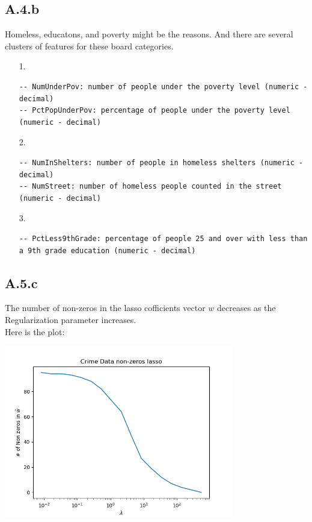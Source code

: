 \documentclass[]{article}
\begin{document}
    \subsection*{A.4.b}
        Homeless, educatons, and poverty might be the reasons. And there are several clusters of features for these board categories.
        \begin{enumerate}
            \item[1.] \begin{lstlisting}
-- NumUnderPov: number of people under the poverty level (numeric - decimal)
-- PctPopUnderPov: percentage of people under the poverty level (numeric - decimal)
            \end{lstlisting}
            \item[2.]
            \begin{lstlisting}
-- NumInShelters: number of people in homeless shelters (numeric - decimal)
-- NumStreet: number of homeless people counted in the street (numeric - decimal)
            \end{lstlisting} 
            \item[3.]
            \begin{lstlisting}
-- PctLess9thGrade: percentage of people 25 and over with less than a 9th grade education (numeric - decimal)
            \end{lstlisting} 
        \end{enumerate}
    \subsection*{A.5.c}
        The number of non-zeros in the lasso cofficients vector $w$ decreases as the Regularization parameter increases. 
        \\
        Here is the plot: 
        \begin{center}
            \includegraphics[width=10cm]{A5a-plot.png}
        \end{center}
\end{document}
